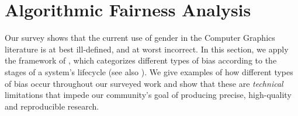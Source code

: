 \documentclass[nonacm,sigconf,review,balance=false]{acmart}
\begin{document}

\section{Algorithmic Fairness Analysis}

Our survey shows that the current use of gender in the Computer Graphics literature is at best ill-defined, and at worst incorrect.
In this section,
we apply the framework of \citet{Suresh2021}, which categorizes different types of bias according to the stages of a system's lifecycle (see also \cite{fairnesssurvey, SocialData, FriedmanAndNissenbaum}).
We give examples of how different types of bias occur throughout our surveyed work and show that these are \emph{technical} limitations that impede our community's goal of producing precise, high-quality and reproducible research.
\end{document}
